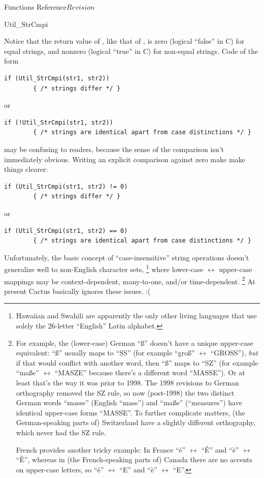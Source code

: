 \begin{cactuspart}{ Functions Reference}{}{$Revision$}
\begin{FunctionDescription}{Util\_StrCmpi}
\begin{Discussion}
Notice that the return value of , like that of
, is zero (logical ``false'' in C) for equal strings,
and nonzero (logical ``true'' in C) for non-equal strings.
Code of the form
\begin{verbatim}
if (Util_StrCmpi(str1, str2))
        { /* strings differ */ }
\end{verbatim}
or
\begin{verbatim}
if (!Util_StrCmpi(str1, str2))
        { /* strings are identical apart from case distinctions */ }
\end{verbatim}
may be confusing to readers, because the sense of the comparison
isn't immediately obvious.  Writing an explicit comparison against zero
make make things clearer:
\begin{verbatim}
if (Util_StrCmpi(str1, str2) != 0)
        { /* strings differ */ }
\end{verbatim}
or
\begin{verbatim}
if (Util_StrCmpi(str1, str2) == 0)
        { /* strings are identical apart from case distinctions */ }
\end{verbatim}

Unfortunately, the basic concept of ``case-insensitive'' string
operations doesn't generalize well to non-English character sets,%
\footnote{%
	 Hawaiian and Swahili are apparently the only
	 other living languages that use solely the
	 26-letter ``English'' Latin alphabet.
	 }%
{} where lower-case $\leftrightarrow$ upper-case mappings may be
context-dependent, many-to-one, and/or time-dependent.%
\footnote{%
	 For example, the (lower-case) German ``\ss''
	 doesn't have a unique upper-case equivalent:
	 ``\ss'' usually maps to ``SS''
	 (for example ``gro\ss'' $\leftrightarrow$ ``GROSS''),
	 {\em but\/} if that would conflict
	 with another word, then ``\ss'' maps to ``SZ''
	 (for example ``ma\ss{}e'' $\leftrightarrow$ ``MASZE''
	 because there's a different word ``MASSE'').
	 Or at least that's the way it was prior to 1998.
	 The 1998 revisions to German orthography
	 removed the SZ rule, so now (post-1998) the two
	 distinct German words ``masse'' (English ``mass'')
	 and ``ma\ss{}e'' (``measures'') have identical
	 upper-case forms ``MASSE''.  To further complicate
	 matters, (the German-speaking parts of) Switzerland
	 have a slightly different orthography, which never
	 had the SZ rule.

	 French provides another tricky example:
	 In France ``\'e'' $\leftrightarrow$ ``\'E'' and
	 ``\`e'' $\leftrightarrow$ ``\`E'',
	 whereas in (the French-speaking parts of) Canada
	 there are no accents on upper-case letters, so
	 ``\'e'' $\leftrightarrow$ ``E'' and
	 ``\`e'' $\leftrightarrow$ ``E''.
	 }%
{}  At present Cactus basically ignores these issues. :(
\end{Discussion}


\end{FunctionDescription}
\end{cactuspart}
